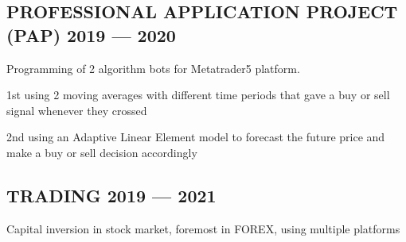 \documentclass[letter,10pt]{article}
\begin{document}
\subsection{{PROFESSIONAL APPLICATION PROJECT (PAP) \hfill  2019 --- 2020}}
\begin{zitemize}
\item Programming of 2 algorithm bots for Metatrader5 platform.
\item 1st using 2 moving averages with different time periods that gave a buy or sell signal whenever they crossed
\item 2nd using an Adaptive Linear Element model to forecast the future price and make a buy or sell decision accordingly
\end{zitemize}

\subsection{{TRADING \hfill  2019 --- 2021}}
\begin{zitemize}
\item Capital inversion in stock market, foremost in FOREX, using multiple platforms
\end{zitemize}
\end{document}
